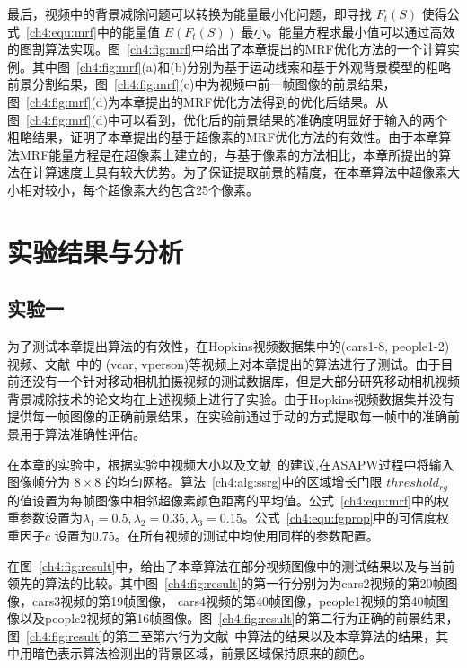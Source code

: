最后，视频中的背景减除问题可以转换为能量最小化问题，即寻找 $F_{t}(S)$ 使得公式~\ref{ch4:equ:mrf}中的能量值 $E(F_{t}(S))$ 最小。能量方程求最小值可以通过高效的图割算法\cite{graphcut04}实现。图~\ref{ch4:fig:mrf}中给出了本章提出的MRF优化方法的一个计算实例。其中图~\ref{ch4:fig:mrf}(a)和(b)分别为基于运动线索和基于外观背景模型的粗略前景分割结果，图~\ref{ch4:fig:mrf}(c)中为视频中前一帧图像的前景结果，图~\ref{ch4:fig:mrf}(d)为本章提出的MRF优化方法得到的优化后结果。从图~\ref{ch4:fig:mrf}(d)中可以看到，优化后的前景结果的准确度明显好于输入的两个粗略结果，证明了本章提出的基于超像素的MRF优化方法的有效性。由于本章算法MRF能量方程是在超像素上建立的，与基于像素的方法\cite{Multitransform,SubspaceTracking}相比，本章所提出的算法在计算速度上具有较大优势。为了保证提取前景的精度，在本章算法中超像素大小相对较小，每个超像素大约包含25个像素。 \par


 \section{实验结果与分析}
 \label{ch4:sec:results}
 \subsection{实验一}
 \label{ch4:sec:sub:test1}

为了测试本章提出算法的有效性，在Hopkins视频数据集\cite{HopKinsDataSet}中的(cars1-8, people1-2)视频、文献~中的 (vcar, vperson)等视频上对本章提出的算法进行了测试。由于目前还没有一个针对移动相机拍摄视频的测试数据库，但是大部分研究移动相机视频背景减除技术的论文均在上述视频上进行了实验\cite{iccv2009,LimPRFloating,Multitransform,kwak2011Generalized}。由于Hopkins视频数据集并没有提供每一帧图像的正确前景结果，在实验前通过手动的方式提取每一帧中的准确前景用于算法准确性评估。\par
在本章的实验中，根据实验中视频大小以及文献~\cite{Liu_2013ASAP}的建议,在ASAPW过程中将输入图像帧分为 $8\times8$ 的均匀网格。算法~\ref{ch4:alg:ssrg}中的区域增长门限 $threshold_{rg}$ 的值设置为每帧图像中相邻超像素颜色距离的平均值。公式~\ref{ch4:equ:mrf}中的权重参数设置为$\lambda_{1} = 0.5, \lambda_{2} = 0.35, \lambda_{3} = 0.15$。公式~\ref{ch4:equ:fgprop}中的可信度权重因子$c$ 设置为$0.75$。在所有视频的测试中均使用同样的参数配置。 \par
在图~\ref{ch4:fig:result}中，给出了本章算法在部分视频图像中的测试结果以及与当前领先的算法\cite{kwak2011Generalized,Multitransform,5.8s}的比较。其中图~\ref{ch4:fig:result}的第一行分别为为cars2视频的第20帧图像，cars3视频的第19帧图像， cars4视频的第40帧图像，people1视频的第40帧图像以及people2视频的第16帧图像。图~\ref{ch4:fig:result}的第二行为正确的前景结果，图~\ref{ch4:fig:result}的第三至第六行为文献~中算法的结果以及本章算法的结果，其中用暗色表示算法检测出的背景区域，前景区域保持原来的颜色。

